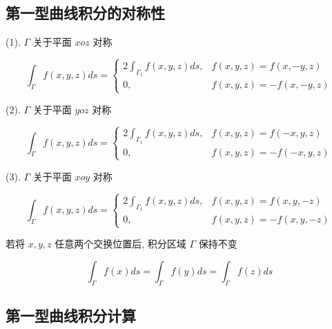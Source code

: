 \subsection{第一型曲线积分的对称性}

\begin{definition}[普通对称性]
	(1). $\Gamma$ 关于平面 $xoz$ 对称

	$$\int_{\Gamma}f(x,y,z)ds = 
	\begin{cases}
		2\int_{\Gamma_{1}}f(x,y,z)ds, & f(x,y,z) = f(x,-y,z)\\
		0,                                     & f(x,y,z) = -f(x,-y,z)
	\end{cases}$$

	(2). $\Gamma$ 关于平面 $yoz$ 对称

	$$\int_{\Gamma}f(x,y,z)ds =
	\begin{cases}
		2\int_{\Gamma_{1}}f(x,y,z)ds, & f(x,y,z) = f(-x,y,z)\\
		0,                                     & f(x,y,z) = -f(-x,y,z)
	\end{cases}$$

	(3). $\Gamma$ 关于平面 $xoy$ 对称

	$$\int_{\Gamma}f(x,y,z)ds =
	\begin{cases}
		2\int_{\Gamma_{1}}f(x,y,z)ds, & f(x,y,z) = f(x,y,-z)\\
		0,                                     & f(x,y,z) = -f(x,y,-z)
	\end{cases}$$
\end{definition}

\begin{definition}[轮换对称性]
	若将 $x,y,z$ 任意两个交换位置后, 积分区域 $\Gamma$ 保持不变

	$$\int_{\Gamma}f(x)ds=\int_{\Gamma}f(y)ds=\int_{\Gamma}f(z)ds$$
\end{definition}

\subsection{第一型曲线积分计算}

